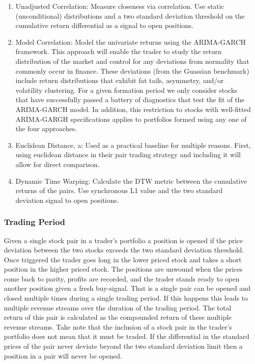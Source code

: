 \documentclass[12pt]{article}
\begin{document}
\begin{enumerate}
    \item Unadjusted Correlation: Measure closeness via correlation. Use static (unconditional) distributions and a two standard deviation threshold on the cumulative return differential as a signal to open positions.
    \item Model Correlation: Model the univariate returns using the ARIMA-GARCH framework. This approach will enable the trader to study the return distribution of the market and control for any deviations from normality that commonly occur in finance. These deviations (from the Guassian benchmark) include return distributions that exhibit fat tails, asymmetry, and/or volatility clustering. For a given formation period we only consider stocks that have successfully passed a battery of diagnostics that test the fit of the ARIMA-GARCH model. In addition, this restriction to stocks with well-fitted ARIMA-GARGH specifications applies to portfolios formed using any one of the four approaches.
    \item Euclidean Distance, a: Used as a practical baseline for multiple reasons. First, \cite{Gatev_et_al_2006} using euclidean distance in their pair trading strategy and including it will allow for direct comparison.
    \item Dynamic Time Warping: Calculate the DTW metric between the cumulative returns of the pairs. Use synchronous L1 value and the two standard deviation signal to open positions.
\end{enumerate}

\subsubsection{Trading Period}

Given a single stock pair in a trader's portfolio a position is opened if the price deviation between the two stocks exceeds the two standard deviation threshold. Once triggered the trader goes long in the lower priced stock and takes a short position in the higher priced stock. The positions are unwound when the prices come back to parity, profits are recorded, and the trader stands ready to open another position given a fresh buy-signal. That is a single pair can be opened and closed multiple times during a single trading period. If this happens this leads to multiple revenue streams over the duration of the trading period. The total return of this pair is calculated as the compounded return of these multiple revenue streams. Take note that the inclusion of a stock pair in the trader's portfolio does not mean that it must be traded. If the differential in the standard prices of the pair never deviate beyond the two standard deviation limit then a position in a pair will never be opened.
\end{document}
